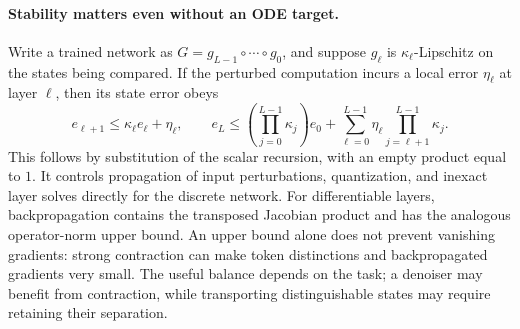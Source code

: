 \documentclass[11pt]{amsart}
\numberwithin{equation}{section}
\theoremstyle{plain}
\begin{document}
\vspace{2mm}
\paragraph{\textbf{Stability matters even without an ODE target.}}
Write a trained network as $G=g_{L-1}\circ\cdots\circ g_0$, and suppose
$g_\ell$ is $\kappa_\ell$-Lipschitz on the states being compared.  If the
perturbed computation incurs a local error $\eta_\ell$ at layer $\ell$,
then its state error obeys
\[
 e_{\ell+1}\leq\kappa_\ell e_\ell+\eta_\ell,
 \qquad
 e_L\leq\left(\prod_{j=0}^{L-1}\kappa_j\right)e_0
       +\sum_{\ell=0}^{L-1}\eta_\ell
                     \prod_{j=\ell+1}^{L-1}\kappa_j.
\]
This follows by substitution of the scalar recursion, with an empty product
equal to $1$.  It controls propagation of input perturbations, quantization,
and inexact layer solves directly for the discrete network.  For
differentiable layers, backpropagation contains the transposed Jacobian
product and has the analogous operator-norm upper bound.  An upper bound
alone does not prevent vanishing gradients: strong contraction can make token distinctions and backpropagated gradients
very small.  The useful balance depends on the task;
a denoiser may benefit from contraction, while transporting distinguishable
states may require retaining their separation.
\end{document}
